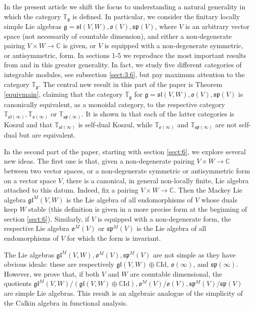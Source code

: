 \documentclass[10pt]{amsart}
\newcommand {\CC} {\mathbb {C}}
\newcommand{\TT}{\mathbb{T}}
\renewcommand{\sp}{\mathfrak{sp}}
\renewcommand{\sl}{\mathfrak{sl}}
\newcommand{\oo}{\mathfrak{o}}
\renewcommand{\gg}{\mathfrak{g}}
\newcommand{\gl}{\mathfrak{gl}}
\begin{document}
In the present article we shift the focus to understanding a natural
generality in which the category $\TT_\gg$ is defined. 
In particular, we consider the finitary locally simple Lie algebras
$\gg = \sl(V,W), \oo(V), \sp(V)$, 
where $V$ is an arbitrary vector space (not necessarily of countable dimension), and either a non-degenerate pairing 
$V \times W \rightarrow \CC$ is given, or $V$ is equipped with a
non-degenerate symmetric, or antisymmetric, form. In sections 1-5 we
reproduce the most important results from \cite{pstyr} and \cite{DPS}
in this greater generality. In fact, we study five different
categories of integrable modules, see subsection \ref{sect:3.6}, but
pay maximum attention to the category $\TT_\gg$. The central new
result in this part of the paper is Theorem \ref{equivmain}, claiming
that the category $\TT_\gg$ for $\gg = \sl(V,W), \oo(V), \sp(V)$ is canonically equivalent, as a
monoidal category, to the respective category 
$\TT_{\sl(\infty)}, \TT_{\oo(\infty)}$ or $\TT_{\sp(\infty)}$. It is
shown in \cite{DPS} 
that each of the latter categories is Koszul and that
$\TT_{\sl(\infty)}$ is self-dual Koszul, while 
$\TT_{\oo(\infty)}$ and $\TT_{\sp(\infty)}$ are not self-dual but are equivalent.

In the second part of the paper, starting with section \ref{sect:6},
we explore several new ideas. The first one is that, 
given a non-degenerate pairing $V \times W \rightarrow \CC$ between
two vector spaces, or a non-degenerate symmetric or antisymmetric form
on a vector space $V$, there is a canonical, in general non-locally
finite, Lie algebra attached to this datum. 
Indeed, fix a pairing $V \times W \rightarrow \CC$. Then the Mackey
Lie algebra $\gl^M(V,W)$ is the Lie algebra of all endomorphisms of
$V$ whose duals keep $W$ stable (this definition is given in a more
precise form at the beginning of section 
\ref{sect:6}). Similarly, if $V$ is equipped with a non-degenerate
form, the respective Lie algebra 
$\oo^M(V)$ or $\sp^M(V)$ is the Lie algebra of all endomorphisms of $V$ for which the form is invariant. 

The Lie algebras $\gl^M(V,W),\oo^M(V),\sp^M(V)$ are not simple as they
have obvious ideals: these are respectively 
$\gl(V,W) \oplus \CC\mathrm{Id}$, $\oo(\infty)$, and $\sp(\infty)$. However, we
prove that, if both $V$ and $W$ are countable dimensional, the
quotients $\gl^M(V,W)/(\gl(V,W)\oplus\CC\mathrm{Id}), \oo^M(V)/\oo(V),
\sp^M(V)/\sp(V)$ are simple Lie algebras. 
This result is an algebraic analogue of the simplicity of the Calkin algebra in functional analysis.
\end{document}
